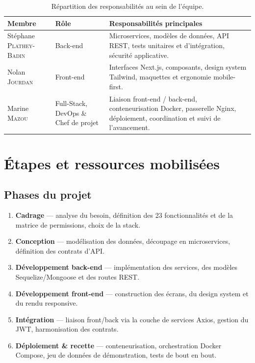 \begin{table}[H]
\centering
\renewcommand{\arraystretch}{1.25}
\begin{tabularx}{\textwidth}{@{}>{\raggedright\arraybackslash}p{3.2cm} >{\raggedright\arraybackslash}p{2.7cm} X@{}}
\toprule
\textbf{Membre} & \textbf{Rôle} & \textbf{Responsabilités principales} \\
\midrule
Stéphane \textsc{Plathey-Badin} & Back-end &
Microservices, modèles de données, API REST, tests unitaires et d'intégration,
sécurité applicative. \\
\addlinespace
Nolan \textsc{Jourdan} & Front-end &
Interfaces Next.js, composants, design system Tailwind, maquettes et ergonomie
mobile-first. \\
\addlinespace
Marine \textsc{Mazou} & Full-Stack, DevOps \& Chef de projet &
Liaison front-end / back-end, conteneurisation Docker, passerelle Nginx,
déploiement, coordination et suivi de l'avancement. \\
\bottomrule
\end{tabularx}
\caption{Répartition des responsabilités au sein de l'équipe.}
\end{table}

\newpage

\section{Étapes et ressources mobilisées}

\subsection{Phases du projet}

\begin{enumerate}[leftmargin=1.6em]
  \item \textbf{Cadrage} — analyse du besoin, définition des 23 fonctionnalités et
        de la matrice de permissions, choix de la stack.
  \item \textbf{Conception} — modélisation des données, découpage en
        microservices, définition des contrats d'API.
  \item \textbf{Développement back-end} — implémentation des services, des modèles
        Sequelize/Mongoose et des routes REST.
  \item \textbf{Développement front-end} — construction des écrans, du design
        system et du rendu responsive.
  \item \textbf{Intégration} — liaison front/back via la couche de services Axios,
        gestion du JWT, harmonisation des contrats.
  \item \textbf{Déploiement \& recette} — conteneurisation, orchestration Docker
        Compose, jeu de données de démonstration, tests de bout en bout.
\end{enumerate}

